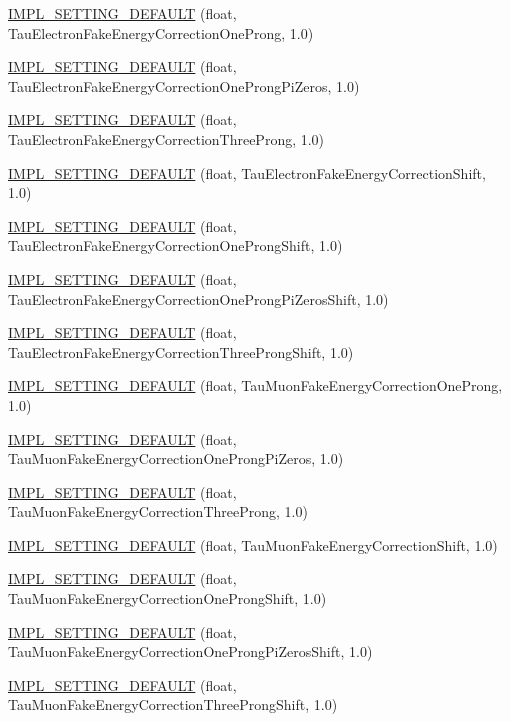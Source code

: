 \begin{DoxyCompactItemize}
\hyperlink{classHttSettings_ab36239985c161a7043a6ecc38f0808ec}{IMPL\_\-SETTING\_\-DEFAULT} (float, TauElectronFakeEnergyCorrectionOneProng, 1.0)
\item 
\hyperlink{classHttSettings_a8a2bc381791e361f3d1f2099a8fc210d}{IMPL\_\-SETTING\_\-DEFAULT} (float, TauElectronFakeEnergyCorrectionOneProngPiZeros, 1.0)
\item 
\hyperlink{classHttSettings_a5de7225a3bae5b74e3f57a0784c4a6a9}{IMPL\_\-SETTING\_\-DEFAULT} (float, TauElectronFakeEnergyCorrectionThreeProng, 1.0)
\item 
\hyperlink{classHttSettings_ac5326a137aaeaacb3ac8bb41f7f57d4f}{IMPL\_\-SETTING\_\-DEFAULT} (float, TauElectronFakeEnergyCorrectionShift, 1.0)
\item 
\hyperlink{classHttSettings_a7fa9710a76d1e33edb134b1da8b8308f}{IMPL\_\-SETTING\_\-DEFAULT} (float, TauElectronFakeEnergyCorrectionOneProngShift, 1.0)
\item 
\hyperlink{classHttSettings_a70ec2ba6c5823ecd784b3cc84582592c}{IMPL\_\-SETTING\_\-DEFAULT} (float, TauElectronFakeEnergyCorrectionOneProngPiZerosShift, 1.0)
\item 
\hyperlink{classHttSettings_ababa9276adbac2fb90ebb2c502ef3976}{IMPL\_\-SETTING\_\-DEFAULT} (float, TauElectronFakeEnergyCorrectionThreeProngShift, 1.0)
\item 
\hyperlink{classHttSettings_a7a50f923a076ad48c0a43d64124fc9e2}{IMPL\_\-SETTING\_\-DEFAULT} (float, TauMuonFakeEnergyCorrectionOneProng, 1.0)
\item 
\hyperlink{classHttSettings_a60758c002601ce89d79abe088a533c4d}{IMPL\_\-SETTING\_\-DEFAULT} (float, TauMuonFakeEnergyCorrectionOneProngPiZeros, 1.0)
\item 
\hyperlink{classHttSettings_a2d642e8ff52e663309a1fa01e4d5434e}{IMPL\_\-SETTING\_\-DEFAULT} (float, TauMuonFakeEnergyCorrectionThreeProng, 1.0)
\item 
\hyperlink{classHttSettings_a099ef27311d172e0a1bc4f218fe06f36}{IMPL\_\-SETTING\_\-DEFAULT} (float, TauMuonFakeEnergyCorrectionShift, 1.0)
\item 
\hyperlink{classHttSettings_a29def60556d711089d60d145a48b66fa}{IMPL\_\-SETTING\_\-DEFAULT} (float, TauMuonFakeEnergyCorrectionOneProngShift, 1.0)
\item 
\hyperlink{classHttSettings_ad096991b045aed584c1612ee93ae6ea1}{IMPL\_\-SETTING\_\-DEFAULT} (float, TauMuonFakeEnergyCorrectionOneProngPiZerosShift, 1.0)
\item 
\hyperlink{classHttSettings_aa5aa20e4627da32fa2de62bd6df5b45e}{IMPL\_\-SETTING\_\-DEFAULT} (float, TauMuonFakeEnergyCorrectionThreeProngShift, 1.0)

\end{DoxyCompactItemize}
